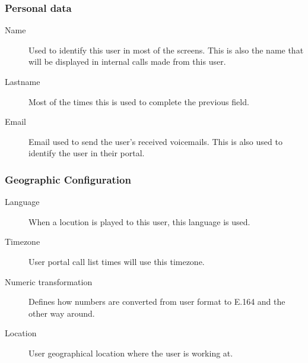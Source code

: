 \documentclass[letterpaper,10pt,spanish]{sphinxmanual}
\begin{document}
\subsubsection{Personal data}
\label{administration_portal/client/vpbx/users:personal-data}\begin{description}
\item[{Name}] \leavevmode{}\label{administration_portal/client/vpbx/users:term-name}
Used to identify this user in most of the screens. This is also the
name that will be displayed in internal calls made from this user.

\item[{Lastname}] \leavevmode{}\label{administration_portal/client/vpbx/users:term-lastname}
Most of the times this is used to complete the previous field.

\item[{Email}] \leavevmode{}\label{administration_portal/client/vpbx/users:term-email}
Email used to send the user's received voicemails. This is also used to
identify the user in their portal.

\end{description}


\subsubsection{Geographic Configuration}
\label{administration_portal/client/vpbx/users:geographic-configuration}\begin{description}
\item[{Language}] \leavevmode{}\label{administration_portal/client/vpbx/users:term-language}
When a locution is played to this user, this language is used.

\item[{Timezone}] \leavevmode{}\label{administration_portal/client/vpbx/users:term-timezone}
User portal call list times will use this timezone.

\item[{Numeric transformation}] \leavevmode{}\label{administration_portal/client/vpbx/users:term-numeric-transformation}
Defines how numbers are converted from user format to E.164 and
the other way around.

\item[{Location}] \leavevmode{}\label{administration_portal/client/vpbx/users:term-location}
User geographical location where the user is working at.

\end{description}
\end{document}
